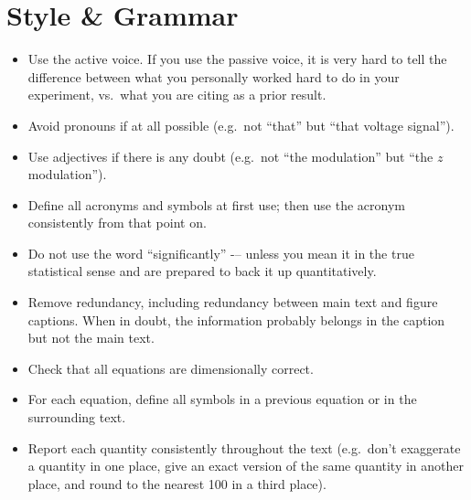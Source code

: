 \section{\label{sec:Style}Style \& Grammar}

\begin{itemize}[label=$\Box$]
\item Use the active voice. If you use the passive voice, it is very hard to tell the difference between what you personally worked hard to do in your experiment, vs.\ what you are citing as a prior result.
\item Avoid pronouns if at all possible (e.g.\ not ``that'' but ``that voltage signal'').
\item Use adjectives if there is any doubt (e.g.\ not ``the modulation'' but ``the $z$ modulation'').
\item Define all acronyms and symbols at first use; then use the acronym consistently from that point on.
\item Do not use the word ``significantly'' -– unless you mean it in the true statistical sense and are prepared to back it up quantitatively.
\item Remove redundancy, including redundancy between main text and figure captions. When in doubt, the information probably belongs in the caption but not the main text.
\item Check that all equations are dimensionally correct.
\item For each equation, define all symbols in a previous equation or in the surrounding text.
\item Report each quantity consistently throughout the text (e.g.\ don't exaggerate a quantity in one place, give an exact version of the same quantity in another place, and round to the nearest 100 in a third place).

\end{itemize}
